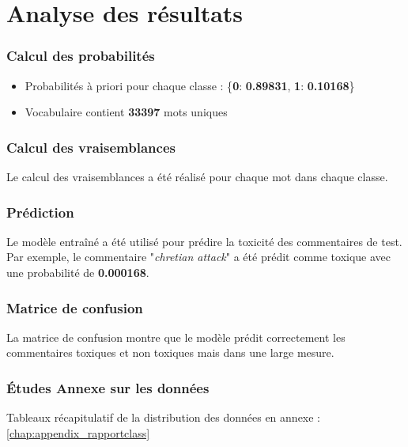 \section{Analyse des résultats}

\subsubsection{Calcul des probabilités}

\begin{itemize}
    \item Probabilités à priori pour chaque classe : \{\textbf{0}: \textbf{0.89831}, \textbf{1}: \textbf{0.10168}\}
    \item Vocabulaire contient \textbf{33397} mots uniques
\end{itemize}

\subsubsection{Calcul des vraisemblances}

Le calcul des vraisemblances a été réalisé pour chaque mot dans chaque classe.

\subsubsection{Prédiction}

Le modèle entraîné a été utilisé pour prédire la toxicité des commentaires de test. Par exemple, le commentaire "\textit{chretian attack}" a été prédit comme toxique avec une probabilité de \textbf{0.000168}.

\subsubsection{Matrice de confusion}

La matrice de confusion montre que le modèle prédit correctement les commentaires toxiques et non toxiques mais dans une large mesure.



\subsubsection{Études Annexe sur les données}

Tableaux récapitulatif de la distribution des données en annexe :  \ref{chap:appendix_rapportclass}